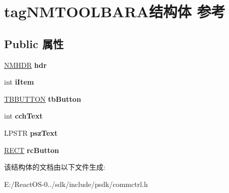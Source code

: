 \hypertarget{structtag_n_m_t_o_o_l_b_a_r_a}{}\section{tag\+N\+M\+T\+O\+O\+L\+B\+A\+R\+A结构体 参考}
\label{structtag_n_m_t_o_o_l_b_a_r_a}
\subsection*{Public 属性}
\begin{DoxyCompactItemize}
\item 
\mbox{\label{structtag_n_m_t_o_o_l_b_a_r_a_aa7361b1a0d1defc91cb1bbea78efdaec}} 
\hyperlink{structtag_n_m_h_d_r}{N\+M\+H\+DR} {\bfseries hdr}
\item 
\mbox{\label{structtag_n_m_t_o_o_l_b_a_r_a_ad8370dc69c64919b6c4314737673215c}} 
int {\bfseries i\+Item}
\item 
\mbox{\label{structtag_n_m_t_o_o_l_b_a_r_a_a085e6921f7fd0b66cf6145d5f5559635}} 
\hyperlink{struct___t_b_b_u_t_t_o_n}{T\+B\+B\+U\+T\+T\+ON} {\bfseries tb\+Button}
\item 
\mbox{\label{structtag_n_m_t_o_o_l_b_a_r_a_a9f8cd73316d0b60eced4e896fd4ef071}} 
int {\bfseries cch\+Text}
\item 
\mbox{\label{structtag_n_m_t_o_o_l_b_a_r_a_af755dc7d04c4f2936db68d2078951f6b}} 
L\+P\+S\+TR {\bfseries psz\+Text}
\item 
\mbox{\label{structtag_n_m_t_o_o_l_b_a_r_a_a2aa30584eb4d0ed136cb9b0d70647adf}} 
\hyperlink{structtag_r_e_c_t}{R\+E\+CT} {\bfseries rc\+Button}
\end{DoxyCompactItemize}


该结构体的文档由以下文件生成\+:\begin{DoxyCompactItemize}
\item 
E\+:/\+React\+O\+S-\/0../sdk/include/psdk/commctrl.\+h\end{DoxyCompactItemize}
